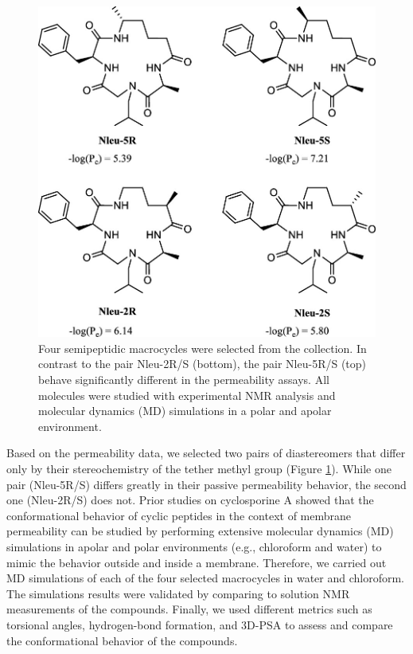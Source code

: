 %
\begin{figure}
    \centering
    \includegraphics[width=\textwidth]{7_chapter_5/fig/intro/permCliffMols.jpeg}
    \caption{Four semipeptidic macrocycles were selected from the collection. In contrast to the pair Nleu-2R/S (bottom), the pair Nleu-5R/S (top) behave significantly  different in the permeability assays. All molecules were  studied with experimental NMR analysis and molecular dynamics (MD) simulations in a polar and apolar environment.}
    \label{fig:permCMols}
\end{figure}
Based on the permeability data, we selected two pairs of diastereomers that differ only by their stereochemistry of the tether methyl group (Figure \ref{fig:permCMols}). While one pair (Nleu-5R/S) differs greatly in their passive permeability behavior, the second one (Nleu-2R/S) does not. 
Prior studies on cyclosporine A showed that the conformational behavior of cyclic peptides in the context of membrane permeability can be studied by performing extensive molecular dynamics (MD) simulations in apolar and polar environments (e.g., chloroform and water) to mimic the behavior outside and inside a membrane. \cite{Witek2016,Witek2017, Witek2019, Wang2021}
Therefore, we carried out MD simulations of each of the four selected macrocycles in water and chloroform. The simulations results were validated by comparing to solution NMR measurements of the compounds. \cite{Balazs2019}
Finally, we used different metrics such as torsional angles, hydrogen-bond formation, and 3D-PSA\cite{Sebastiano2018} to assess and compare the conformational behavior of the compounds. 